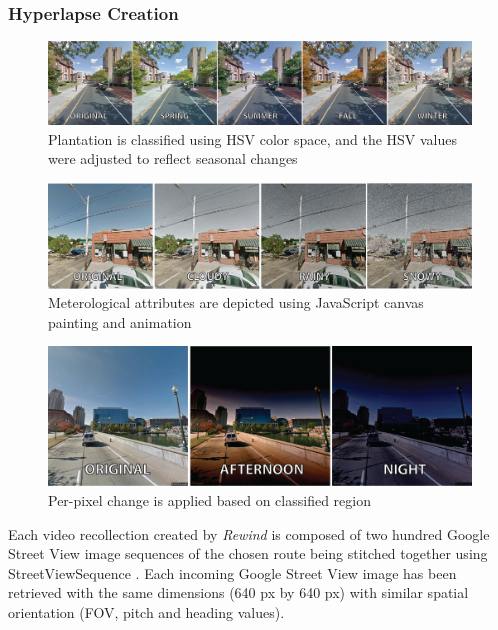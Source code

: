 \documentclass{sigchi}
\begin{document}
\subsubsection{Hyperlapse Creation} 
\begin{figure}
	\centering
	\includegraphics[width=\textwidth]{Rewind-seasons2}
	\caption{Plantation is classified using HSV color space, and the HSV values were adjusted to reflect seasonal changes}
	\label{fig:season}
\end{figure}


\begin{figure}
	\centering
	\includegraphics[width=\textwidth]{Rewind-weather}
	\caption{Meterological attributes are depicted using JavaScript canvas painting and animation}
	\label{fig:weather}
\end{figure}

\begin{figure}
	\centering
	\includegraphics[width=1\linewidth]{Rewind-time_of_day2}
	\caption{Per-pixel change is applied based on classified region}
	\label{fig:timeofday}
\end{figure}

Each video recollection created by \textit{Rewind} is composed of two hundred Google Street View image sequences of the chosen route being stitched together using StreetViewSequence \cite{streetviewsequence}. Each incoming Google Street View image has been retrieved with the same dimensions (640 px by 640 px) with similar spatial orientation (FOV, pitch and heading values).
\end{document}
